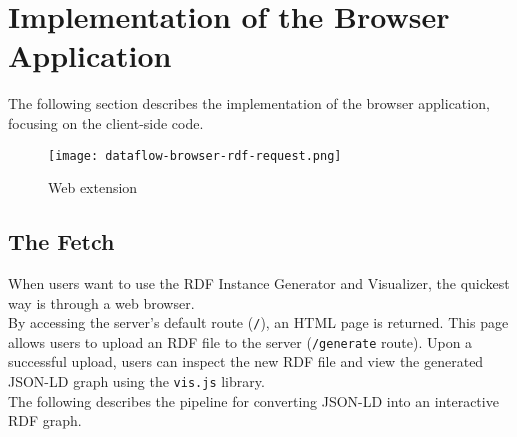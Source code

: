 \section{Implementation of the Browser Application}

The following section describes the implementation of the browser application, focusing on the client-side code.

\begin{figure}[htb]
    \centering
    \texttt{[image: dataflow-browser-rdf-request.png]}
    \caption{Web extension}
    \label{fig:dataflow-browser-rdf-request}
\end{figure}

\subsection{The Fetch}
When users want to use the RDF Instance Generator and Visualizer, the quickest way is through a web browser. 
\\
By accessing the server’s default route (\texttt{/}), an HTML page is returned. This page allows users to upload an RDF file to the server (\texttt{/generate} route). 
Upon a successful upload, users can inspect the new RDF file and view the generated JSON-LD graph using the \texttt{vis.js} library.
\\
The following describes the pipeline for converting JSON-LD into an interactive RDF graph.

